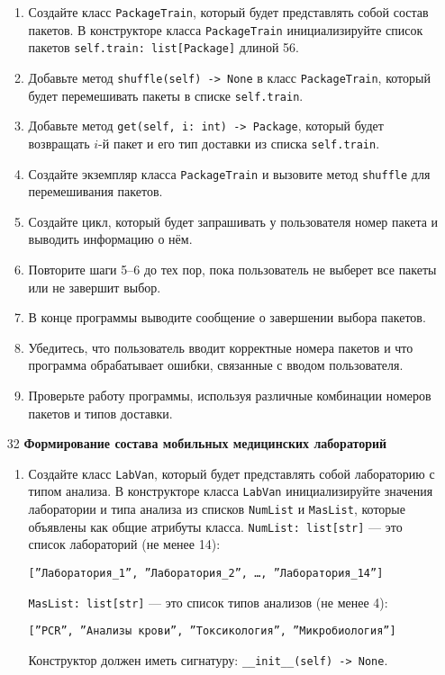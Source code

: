 \begin{enumerate}
\begin{enumerate}
    \item Создайте класс \texttt{PackageTrain}, который будет представлять собой состав пакетов. В конструкторе класса \texttt{PackageTrain} инициализируйте список пакетов \texttt{self.train: list[Package]} длиной 56.

    \item Добавьте метод \texttt{shuffle(self) -> None} в класс \texttt{PackageTrain}, который будет перемешивать пакеты в списке \texttt{self.train}.

    \item Добавьте метод \texttt{get(self, i: int) -> Package}, который будет возвращать $i$-й пакет и его тип доставки из списка \texttt{self.train}.

    \item Создайте экземпляр класса \texttt{PackageTrain} и вызовите метод \texttt{shuffle} для перемешивания пакетов.

    \item Создайте цикл, который будет запрашивать у пользователя номер пакета и выводить информацию о нём.

    \item Повторите шаги 5–6 до тех пор, пока пользователь не выберет все пакеты или не завершит выбор.

    \item В конце программы выводите сообщение о завершении выбора пакетов.

    \item Убедитесь, что пользователь вводит корректные номера пакетов и что программа обрабатывает ошибки, связанные с вводом пользователя.

    \item Проверьте работу программы, используя различные комбинации номеров пакетов и типов доставки.
\end{enumerate}

\item[32] \textbf{Формирование состава мобильных медицинских лабораторий}
\begin{enumerate}
    \item Создайте класс \texttt{LabVan}, который будет представлять собой лабораторию с типом анализа. В конструкторе класса \texttt{LabVan} инициализируйте значения лаборатории и типа анализа из списков \texttt{NumList} и \texttt{MasList}, которые объявлены как общие атрибуты класса. \texttt{NumList: list[str]} — это список лабораторий (не менее 14): 
    \begin{center}
        \texttt{[''Лаборатория\_1'', ''Лаборатория\_2'', \dots, ''Лаборатория\_14'']}
    \end{center}
    \texttt{MasList: list[str]} — это список типов анализов (не менее 4):
    \begin{center}
        \texttt{[''PCR'', ''Анализы крови'', ''Токсикология'', ''Микробиология'']}
    \end{center}
    Конструктор должен иметь сигнатуру: \texttt{\_\_init\_\_(self) -> None}.


\end{enumerate}
\end{enumerate}
